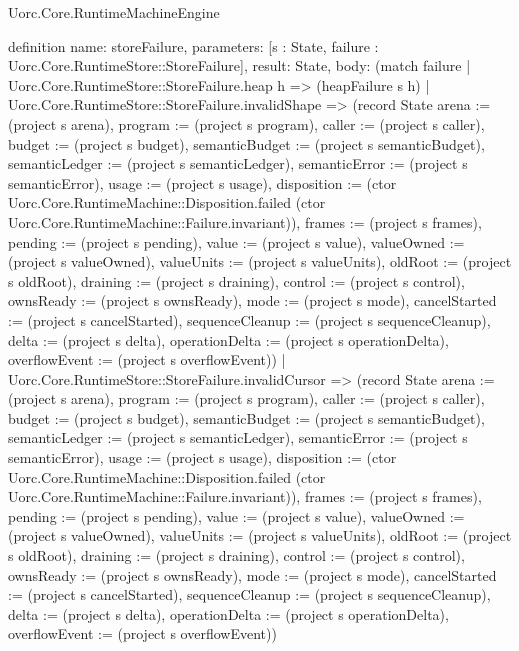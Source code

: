 \begin{lexlean}{Uorc.Core.RuntimeMachineEngine}
\begin{semanticmodule}
definition{
  name: storeFailure,
  parameters: [s : State, failure : Uorc.Core.RuntimeStore::StoreFailure],
  result: State,
  body: (match failure
    | Uorc.Core.RuntimeStore::StoreFailure.heap h => (heapFailure s h)
    | Uorc.Core.RuntimeStore::StoreFailure.invalidShape => (record State {arena := (project s arena), program := (project s program), caller := (project s caller), budget := (project s budget), semanticBudget := (project s semanticBudget), semanticLedger := (project s semanticLedger), semanticError := (project s semanticError), usage := (project s usage), disposition := (ctor Uorc.Core.RuntimeMachine::Disposition.failed (ctor Uorc.Core.RuntimeMachine::Failure.invariant)), frames := (project s frames), pending := (project s pending), value := (project s value), valueOwned := (project s valueOwned), valueUnits := (project s valueUnits), oldRoot := (project s oldRoot), draining := (project s draining), control := (project s control), ownsReady := (project s ownsReady), mode := (project s mode), cancelStarted := (project s cancelStarted), sequenceCleanup := (project s sequenceCleanup), delta := (project s delta), operationDelta := (project s operationDelta), overflowEvent := (project s overflowEvent)})
    | Uorc.Core.RuntimeStore::StoreFailure.invalidCursor => (record State {arena := (project s arena), program := (project s program), caller := (project s caller), budget := (project s budget), semanticBudget := (project s semanticBudget), semanticLedger := (project s semanticLedger), semanticError := (project s semanticError), usage := (project s usage), disposition := (ctor Uorc.Core.RuntimeMachine::Disposition.failed (ctor Uorc.Core.RuntimeMachine::Failure.invariant)), frames := (project s frames), pending := (project s pending), value := (project s value), valueOwned := (project s valueOwned), valueUnits := (project s valueUnits), oldRoot := (project s oldRoot), draining := (project s draining), control := (project s control), ownsReady := (project s ownsReady), mode := (project s mode), cancelStarted := (project s cancelStarted), sequenceCleanup := (project s sequenceCleanup), delta := (project s delta), operationDelta := (project s operationDelta), overflowEvent := (project s overflowEvent)})
}
\end{semanticmodule}
\end{lexlean}
